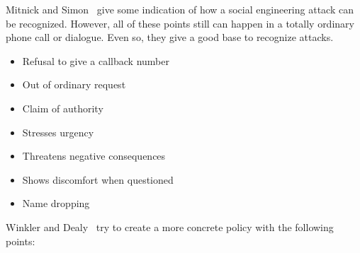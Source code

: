 Mitnick and Simon~\cite{mitnick2003} give some indication of how a social
engineering attack can be recognized. However, all of these points still can
happen in a totally ordinary phone call or dialogue. Even so, they give a good
base to recognize attacks.

\begin{itemize}
  \item Refusal to give a callback number
  \item Out of ordinary request
  \item Claim of authority
  \item Stresses urgency
  \item Threatens negative consequences
  \item Shows discomfort when questioned
  \item Name dropping
\end{itemize}

Winkler and Dealy~\cite{winkler1995} try to create a more concrete policy with
the following points:

